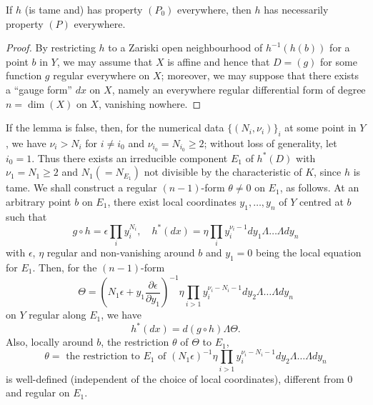 \begin{lemma}\label{chap4:sec6:subsec1:lem1} %
  If $h$ (is tame and) has property $(P_{0})$ everywhere, then $h$ has
  necessarily property $(P)$ everywhere.
\end{lemma}

\begin{proof}
  By restricting $h$ to a Zariski open neighbourhood of $h^{-1}(h(b))$
  for a point $b$ in $Y$, we may assume that $X$ is affine and hence
  that $D=(g)$ for some function $g$ regular everywhere on $X$;
  moreover, we may suppose that there exists a ``gauge form'' $dx$ on
  $X$, namely an everywhere regular differential form of degree
  $n=\dim(X)$ on $X$, vanishing nowhere.
\end{proof}

If the lemma is false, then, for the numerical data
$\{(N_{i},\nu_{i})\}_{i}$ at some point in $Y$, we have
$\nu_{i}>N_{i}$ for $i\neq i_{0}$ and $\nu_{i_{0}}=N_{i_{0}}\geq 2$;
without loss of generality, let $i_{0}=1$. Thus there exists an
irreducible component $E_{1}$ of $h^{\ast}(D)$ with $\nu_{1}=N_{1}\geq
2$ and $N_{1}(=N_{E_{1}})$ not divisible by the characteristic of $K$,
since $h$ is tame. We shall construct a regular $(n-1)$-form
$\theta\neq 0$ on $E_{1}$, as follows. At an arbitrary point $b$ on
$E_{1}$, there exist local coordinates $y_{1},\ldots,y_{n}$ of $Y$
centred at $b$ such that 
$$
g\circ h=\epsilon\prod_{i}y^{N_{i}}_{i},\quad
h^{\ast}(dx)=\eta\prod_{i}y^{\nu_{i}-1}_{i}dy_{1}\Lambda\ldots\Lambda
dy_{n}
$$
with $\epsilon$, $\eta$ regular and non-vanishing around $b$ and
$y_{1}=0$ being the local equation for $E_{1}$. Then, for the
$(n-1)$-form
$$
\Theta=\left(N_{1}\epsilon+y_{1}\frac{\partial\epsilon}{\partial
  y_{1}}\right)^{-1}\eta\prod_{i>1}y^{\nu_{i}-N_{i}-1}_{i}dy_{2}\Lambda\ldots\Lambda
dy_{n} 
$$
on $Y$ regular along $E_{1}$, we have 
$$
h^{\ast}(dx)=d(g\circ h)\Lambda {\Theta}.
$$\pageoriginale
Also, locally around $b$, the restriction $\theta$ of $\Theta$ to
$E_{1}$, \ie
$$
\theta=\text{ the restriction to } E_{1} \text{ of }
(N_{1}\epsilon)^{-1}\eta\prod_{i>1}y^{\nu_{i}-N_{i}-1}_{i}dy_{2}\Lambda\ldots\Lambda
dy_{n}
$$
is well-defined (\ie independent of the choice of local coordinates),
different from $0$ and regular on $E_{1}$.

